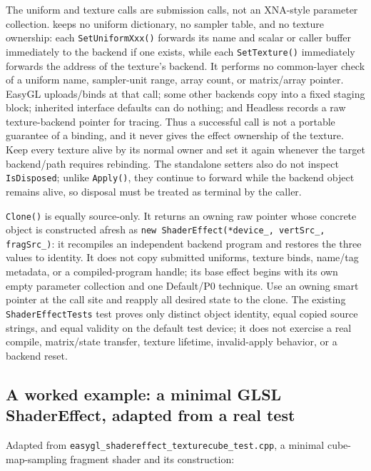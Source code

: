 The uniform and texture calls are submission calls, not an XNA-style parameter collection.
 keeps no uniform dictionary, no sampler table, and no texture ownership:
each \texttt{SetUniformXxx()} forwards its name and scalar or caller buffer immediately to the
backend if one exists, while each \texttt{SetTexture()} immediately forwards the address of the
texture's backend. It performs no common-layer check of a uniform name, sampler-unit range,
array count, or matrix/array pointer. EasyGL uploads/binds at that call; some other backends copy
into a fixed staging block; inherited interface defaults can do nothing; and Headless records a
raw texture-backend pointer for tracing. Thus a successful call is not a portable guarantee of a
binding, and it never gives the effect ownership of the texture. Keep every texture alive by its
normal owner and set it again whenever the target backend/path requires rebinding. The standalone
setters also do not inspect \texttt{IsDisposed}; unlike \texttt{Apply()}, they continue to
forward while the backend object remains alive, so disposal must be treated as terminal by the
caller.

\texttt{Clone()} is equally source-only. It returns an owning raw  pointer
whose concrete object is constructed afresh as
\texttt{new ShaderEffect(*device\_, vertSrc\_, fragSrc\_)}: it recompiles an independent
backend program and restores the three  values to identity. It does
not copy submitted uniforms, texture binds, name/tag metadata, or a compiled-program handle;
its base effect begins with its own empty parameter collection and one Default/P0 technique.
Use an owning smart pointer at the call site and reapply all desired state to the clone. The
existing \texttt{ShaderEffectTests} test proves only distinct object identity, equal copied
source strings, and equal validity on the default test device; it does not exercise a real
compile, matrix/state transfer, texture lifetime, invalid-apply behavior, or a backend reset.

\subsection{A worked example: a minimal GLSL ShaderEffect, adapted from a real test}

Adapted from \texttt{easygl\_shadereffect\_texturecube\_test.cpp}, a minimal
cube-map-sampling fragment shader and its construction:

